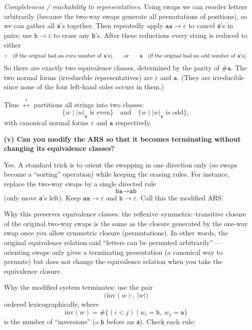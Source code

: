 \documentclass[12pt]{article}
\begin{document}
\emph{Completeness / reachability to representatives.} Using swaps we can reorder letters arbitrarily (because the two-way swaps generate all permutations of positions), so we can gather all \texttt{a}'s together. Then repeatedly apply \(\texttt{aa}\to\varepsilon\) to cancel \texttt{a}'s in pairs; use \(\texttt{b}\to\varepsilon\) to erase any \texttt{b}'s. After these reductions every string is reduced to either
\[
\varepsilon \quad\text{(if the original had an even number of \texttt{a}'s),}
\qquad\text{or}\qquad
\texttt{a} \quad\text{(if the original had an odd number of \texttt{a}'s).}
\]
So there are exactly two equivalence classes, determined by the parity of \(\#\texttt{a}\). The two normal forms (irreducible representatives) are \(\varepsilon\) and \(\texttt{a}\). (They are irreducible since none of the four left-hand sides occurs in them.)

Thus \(\stackrel{*}{\longleftrightarrow}\) partitions all strings into two classes:
\[
\{w\mid |w|_{\texttt{a}}\text{ is even}\}\quad\text{and}\quad\{w\mid |w|_{\texttt{a}}\text{ is odd}\},
\]
with canonical normal forms \(\varepsilon\) and \(\texttt{a}\) respectively.

\bigskip

\textbf{(v) Can you modify the ARS so that it becomes terminating without changing its equivalence classes?}

Yes. A standard trick is to orient the swapping in one direction only (so swaps become a ``sorting'' operation) while keeping the erasing rules. For instance, replace the two-way swaps by a single directed rule
\[
\texttt{ba}\longrightarrow\texttt{ab}
\]
(only move \texttt{a}'s left). Keep \(\texttt{aa}\to\varepsilon\) and \(\texttt{b}\to\varepsilon\). Call this the modified ARS.

Why this preserves equivalence classes: the reflexive–symmetric–transitive closure of the original two-way swaps is the same as the closure generated by the one-way swap once you allow symmetric closure (permutations). In other words, the original equivalence relation said “letters can be permuted arbitrarily” — orienting swaps only gives a terminating presentation (a canonical way to permute) but does not change the equivalence relation when you take the equivalence closure.

Why the modified system terminates: use the pair
\[
\big(\mathrm{inv}(w),\ |w|\big)
\]
ordered lexicographically, where
\[
\mathrm{inv}(w)=\#\{(i<j)\mid w_i=\texttt{b},\ w_j=\texttt{a}\}
\]
is the number of ``inversions'' (a \texttt{b} before an \texttt{a}). Check each rule:
\end{document}
